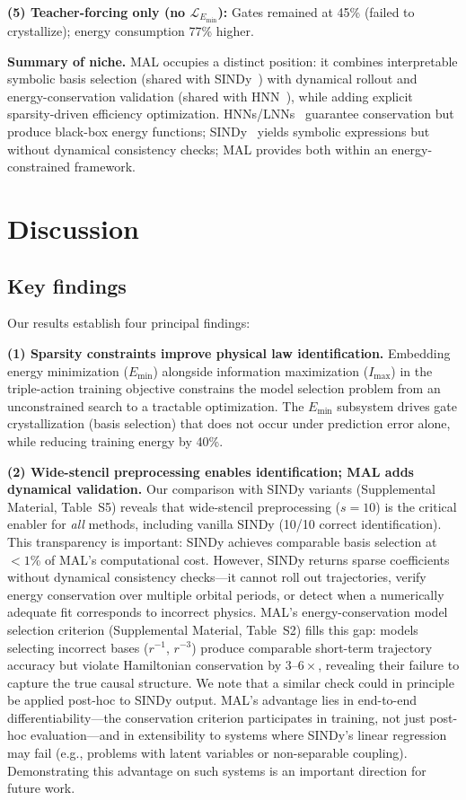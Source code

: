 \documentclass[aps,pre,reprint,superscriptaddress,longbibliography]{revtex4-2}
\begin{document}
\textbf{(5) Teacher-forcing only (no $\mathcal{L}_{E_{\min}}$):} Gates remained at 45\% (failed to crystallize); energy consumption 77\% higher.

\textbf{Summary of niche.} MAL occupies a distinct position: it combines interpretable symbolic basis selection (shared with SINDy~\cite{Brunton2016}) with dynamical rollout and energy-conservation validation (shared with HNN~\cite{Greydanus2019}), while adding explicit sparsity-driven efficiency optimization. HNNs/LNNs~\cite{Greydanus2019, Cranmer2020LNN} guarantee conservation but produce black-box energy functions; SINDy~\cite{Brunton2016} yields symbolic expressions but without dynamical consistency checks; MAL provides both within an energy-constrained framework.

\section{Discussion}

\subsection{Key findings}
Our results establish four principal findings:

\textbf{(1) Sparsity constraints improve physical law identification.} Embedding energy minimization ($E_{\min}$) alongside information maximization ($I_{\max}$) in the triple-action training objective constrains the model selection problem from an unconstrained search to a tractable optimization. The $E_{\mathrm{min}}$ subsystem drives gate crystallization (basis selection) that does not occur under prediction error alone, while reducing training energy by 40\%.

\textbf{(2) Wide-stencil preprocessing enables identification; MAL adds dynamical validation.} Our comparison with SINDy variants (Supplemental Material, Table~S5) reveals that wide-stencil preprocessing ($s=10$) is the critical enabler for \textit{all} methods, including vanilla SINDy (10/10 correct identification). This transparency is important: SINDy achieves comparable basis selection at $<1$\% of MAL's computational cost. However, SINDy returns sparse coefficients without dynamical consistency checks---it cannot roll out trajectories, verify energy conservation over multiple orbital periods, or detect when a numerically adequate fit corresponds to incorrect physics. MAL's energy-conservation model selection criterion (Supplemental Material, Table~S2) fills this gap: models selecting incorrect bases ($r^{-1}$, $r^{-3}$) produce comparable short-term trajectory accuracy but violate Hamiltonian conservation by $3$--$6\times$, revealing their failure to capture the true causal structure. We note that a similar check could in principle be applied post-hoc to SINDy output. MAL's advantage lies in end-to-end differentiability---the conservation criterion participates in training, not just post-hoc evaluation---and in extensibility to systems where SINDy's linear regression may fail (e.g., problems with latent variables or non-separable coupling). Demonstrating this advantage on such systems is an important direction for future work.
\end{document}
